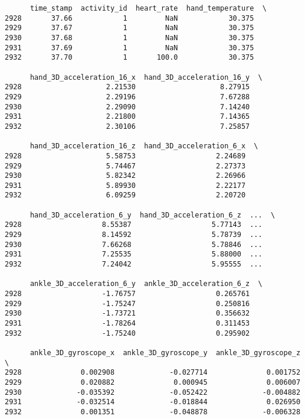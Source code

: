 \documentclass[11pt]{article}
\begin{document}
    
    \begin{verbatim}
      time_stamp  activity_id  heart_rate  hand_temperature  \
2928       37.66            1         NaN            30.375   
2929       37.67            1         NaN            30.375   
2930       37.68            1         NaN            30.375   
2931       37.69            1         NaN            30.375   
2932       37.70            1       100.0            30.375   

      hand_3D_acceleration_16_x  hand_3D_acceleration_16_y  \
2928                    2.21530                    8.27915   
2929                    2.29196                    7.67288   
2930                    2.29090                    7.14240   
2931                    2.21800                    7.14365   
2932                    2.30106                    7.25857   

      hand_3D_acceleration_16_z  hand_3D_acceleration_6_x  \
2928                    5.58753                   2.24689   
2929                    5.74467                   2.27373   
2930                    5.82342                   2.26966   
2931                    5.89930                   2.22177   
2932                    6.09259                   2.20720   

      hand_3D_acceleration_6_y  hand_3D_acceleration_6_z  ...  \
2928                   8.55387                   5.77143  ...   
2929                   8.14592                   5.78739  ...   
2930                   7.66268                   5.78846  ...   
2931                   7.25535                   5.88000  ...   
2932                   7.24042                   5.95555  ...   

      ankle_3D_acceleration_6_y  ankle_3D_acceleration_6_z  \
2928                   -1.76757                   0.265761   
2929                   -1.75247                   0.250816   
2930                   -1.73721                   0.356632   
2931                   -1.78264                   0.311453   
2932                   -1.75240                   0.295902   

      ankle_3D_gyroscope_x  ankle_3D_gyroscope_y  ankle_3D_gyroscope_z  \
2928              0.002908             -0.027714              0.001752   
2929              0.020882              0.000945              0.006007   
2930             -0.035392             -0.052422             -0.004882   
2931             -0.032514             -0.018844              0.026950   
2932              0.001351             -0.048878             -0.006328   


\end{verbatim}
\end{document}
